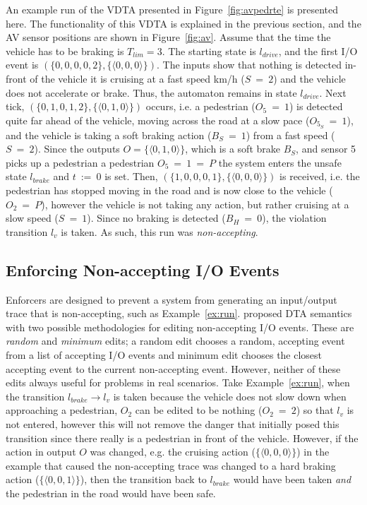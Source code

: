\begin{example}
	\label{ex:run}
	An example run of the VDTA presented in Figure~\ref{fig:avpedrte} is presented here.
	The functionality of this \ac{VDTA} is explained in the previous section, and the \ac{AV} sensor positions are shown in Figure~\ref{fig:av}.
	Assume that the time the vehicle has to be braking is $T_{lim} = 3$. 
	The starting state is $l_{drive}$, and the first I/O event is $(\{0, 0, 0, 0, 2\}, \{\langle 0, 0, 0 \rangle\})$.
	The inputs show that nothing is detected in-front of the vehicle it is cruising at a fast speed km/h ($S~=~2$) and the vehicle does not accelerate or brake.
	Thus, the automaton remains in state $l_{drive}$.
	Next tick, $(\{0, 1, 0, 1, 2\}, \{\langle 0, 1, 0 \rangle\})$ occurs, i.e. a pedestrian ($O_5~=~1$) is detected quite far ahead of the vehicle, moving across the road at a slow pace ($O_{5_S}~=~1$), and the vehicle is taking a soft braking action ($B_S~=~1$) from a fast speed ($S~=~2$).
	Since the outputs ${O} = \{\langle 0, 1, 0 \rangle\}$, which is a soft brake $B_S$, and sensor 5 picks up a pedestrian a pedestrian $O_5~=~1~=~P$ the system enters the unsafe state $l_{brake}$ and $t~:=~0$ is set.
	Then,  $(\{1, 0, 0, 0, 1\}, \{\langle 0, 0, 0 \rangle\})$ is received, i.e. the pedestrian has stopped moving in the road and is now close to the vehicle ($O_2~=~P$), however the vehicle is not taking any action, but rather cruising at a slow speed ($S~=~1$).
	Since no braking is detected ($B_H~=~0$), the violation transition $l_v$ is taken.
	As such, this run was \textit{non-accepting}.
\end{example}

\subsection{Enforcing Non-accepting I/O Events}
Enforcers are designed to prevent a system from generating an input/output trace that is non-accepting, such as Example~\ref{ex:run}.
\cite{recps} proposed \ac{DTA} semantics with two possible methodologies for editing non-accepting I/O events.
These are \textit{random} and \textit{minimum} edits; a random edit chooses a random, accepting event from a list of accepting I/O events and minimum edit chooses the closest accepting event to the current non-accepting event.
However, neither of these edits always useful for problems in real scenarios.
Take Example~\ref{ex:run}, when the transition $l_{brake} \rightarrow l_v$ is taken because the vehicle does not slow down when approaching a pedestrian, $O_2$ can be edited to be nothing ($O_2~=~2$) so that $l_v$ is not entered, however this will not remove the danger that initially posed this transition since there really is a pedestrian in front of the vehicle.
However, if the action in output ${O}$ was changed, e.g. the cruising action ($\{\langle 0, 0, 0 \rangle\}$) in the example that caused the non-accepting trace was changed to a hard braking action ($\{\langle 0, 0, 1 \rangle\}$), then the transition back to $l_{brake}$ would have been taken \textit{and} the pedestrian in the road would have been safe.

